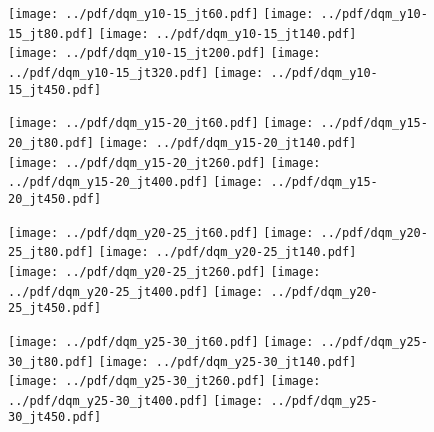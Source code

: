 \documentclass[landscape,10pt]{beamer} %
\begin{document}
\begin{figure}[p]
\texttt{[image: ../pdf/dqm\_y10-15\_jt60.pdf]}
\texttt{[image: ../pdf/dqm\_y10-15\_jt80.pdf]}
\texttt{[image: ../pdf/dqm\_y10-15\_jt140.pdf]}\\
\texttt{[image: ../pdf/dqm\_y10-15\_jt200.pdf]}
\texttt{[image: ../pdf/dqm\_y10-15\_jt320.pdf]}
\texttt{[image: ../pdf/dqm\_y10-15\_jt450.pdf]}
\end{figure}

\newpage

\begin{figure}[p]
\texttt{[image: ../pdf/dqm\_y15-20\_jt60.pdf]}
\texttt{[image: ../pdf/dqm\_y15-20\_jt80.pdf]}
\texttt{[image: ../pdf/dqm\_y15-20\_jt140.pdf]}\\
\texttt{[image: ../pdf/dqm\_y15-20\_jt260.pdf]}
\texttt{[image: ../pdf/dqm\_y15-20\_jt400.pdf]}
\texttt{[image: ../pdf/dqm\_y15-20\_jt450.pdf]}
\end{figure}

\newpage

\begin{figure}[p]
\texttt{[image: ../pdf/dqm\_y20-25\_jt60.pdf]}
\texttt{[image: ../pdf/dqm\_y20-25\_jt80.pdf]}
\texttt{[image: ../pdf/dqm\_y20-25\_jt140.pdf]}\\
\texttt{[image: ../pdf/dqm\_y20-25\_jt260.pdf]}
\texttt{[image: ../pdf/dqm\_y20-25\_jt400.pdf]}
\texttt{[image: ../pdf/dqm\_y20-25\_jt450.pdf]}
\end{figure}

\newpage

\begin{figure}[p]
\texttt{[image: ../pdf/dqm\_y25-30\_jt60.pdf]}
\texttt{[image: ../pdf/dqm\_y25-30\_jt80.pdf]}
\texttt{[image: ../pdf/dqm\_y25-30\_jt140.pdf]}\\
\texttt{[image: ../pdf/dqm\_y25-30\_jt260.pdf]}
\texttt{[image: ../pdf/dqm\_y25-30\_jt400.pdf]}
\texttt{[image: ../pdf/dqm\_y25-30\_jt450.pdf]}
\end{figure}
\end{document}
